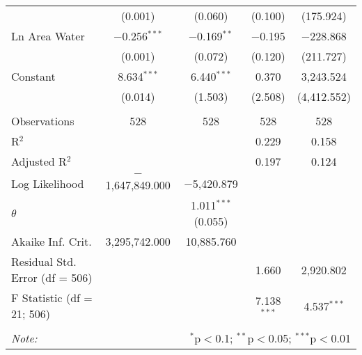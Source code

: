 \begin{table}[!htbp]
\begin{tabular}{@{\extracolsep{5pt}}lcccc}
  & (0.001) & (0.060) & (0.100) & (175.924) \\ 
  Ln Area Water & $-$0.256$^{***}$ & $-$0.169$^{**}$ & $-$0.195 & $-$228.868 \\ 
  & (0.001) & (0.072) & (0.120) & (211.727) \\ 
  Constant & 8.634$^{***}$ & 6.440$^{***}$ & 0.370 & 3,243.524 \\ 
  & (0.014) & (1.503) & (2.508) & (4,412.552) \\ 
 \hline \\[-1.8ex] 
Observations & 528 & 528 & 528 & 528 \\ 
R$^{2}$ &  &  & 0.229 & 0.158 \\ 
Adjusted R$^{2}$ &  &  & 0.197 & 0.124 \\ 
Log Likelihood & $-$1,647,849.000 & $-$5,420.879 &  &  \\ 
$\theta$ &  & 1.011$^{***}$  (0.055) &  &  \\ 
Akaike Inf. Crit. & 3,295,742.000 & 10,885.760 &  &  \\ 
Residual Std. Error (df = 506) &  &  & 1.660 & 2,920.802 \\ 
F Statistic (df = 21; 506) &  &  & 7.138$^{***}$ & 4.537$^{***}$ \\ 
\hline 
\hline \\[-1.8ex] 
\textit{Note:}  & \multicolumn{4}{r}{$^{*}$p$<$0.1; $^{**}$p$<$0.05; $^{***}$p$<$0.01} \\ 
\end{tabular} 
\end{table} 
